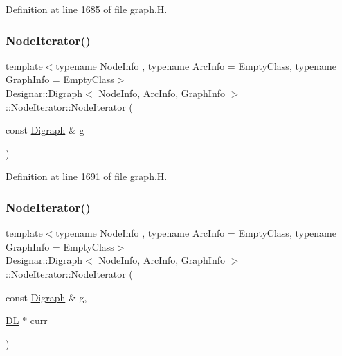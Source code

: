 Definition at line 1685 of file graph.\+H.

\mbox{\label{class_designar_1_1_digraph_1_1_node_iterator_aa54e560d151fad3a8e36c91dc4006ce4}} 
\subsubsection{\texorpdfstring{Node\+Iterator()}{NodeIterator()}\hspace{0.1cm}{\footnotesize\ttfamily [2/5]}}
{\footnotesize\ttfamily template$<$typename Node\+Info , typename Arc\+Info  = Empty\+Class, typename Graph\+Info  = Empty\+Class$>$ \\
\hyperlink{class_designar_1_1_digraph}{Designar\+::\+Digraph}$<$ Node\+Info, Arc\+Info, Graph\+Info $>$\+::Node\+Iterator\+::\+Node\+Iterator (\begin{DoxyParamCaption}\item[{const \hyperlink{class_designar_1_1_digraph}{Digraph} \&}]{g }\end{DoxyParamCaption})\hspace{0.3cm}{\ttfamily [inline]}}



Definition at line 1691 of file graph.\+H.

\mbox{\label{class_designar_1_1_digraph_1_1_node_iterator_a2a8d16402a7ec8ac1675cb2729bc4726}} 
\subsubsection{\texorpdfstring{Node\+Iterator()}{NodeIterator()}\hspace{0.1cm}{\footnotesize\ttfamily [3/5]}}
{\footnotesize\ttfamily template$<$typename Node\+Info , typename Arc\+Info  = Empty\+Class, typename Graph\+Info  = Empty\+Class$>$ \\
\hyperlink{class_designar_1_1_digraph}{Designar\+::\+Digraph}$<$ Node\+Info, Arc\+Info, Graph\+Info $>$\+::Node\+Iterator\+::\+Node\+Iterator (\begin{DoxyParamCaption}\item[{const \hyperlink{class_designar_1_1_digraph}{Digraph} \&}]{g,  }\item[{\hyperlink{class_designar_1_1_d_l}{DL} $\ast$}]{curr }\end{DoxyParamCaption})\hspace{0.3cm}{\ttfamily [inline]}}



